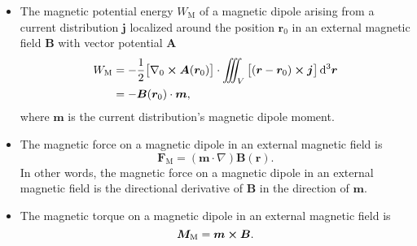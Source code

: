 \documentclass[11pt, a4paper]{article}
\newcommand{\diff}{\mathop{}\!\mathrm{d}} %
\newcommand{\dr}{\diff^{3} \r}  %
\renewcommand{\vec}[1]{\bm{#1}} %
\renewcommand{\r}{\vec{r}}
\newcommand{\B}{\vec{B}} %
\newcommand{\A}{\vec{A}} %
\newcommand{\m}{\vec{m}}  %
\renewcommand{\j}{\vec{j}}  %
\renewcommand{\grad}{\nabla}
\begin{document}
\begin{itemize}
    \item The magnetic potential energy $ W_{\text{M}} $ of a magnetic dipole arising from a current distribution $ \j $ localized around the position $ \r_{0} $ in an external magnetic field $ \B $ with vector potential $ \A $
	\begin{align*}
		W_{\text{M}} &=  -\frac{1}{2} \big[\grad_{0}\cross \A(\r_{0})\big] \cdot \iiint_{V}\big[(\r - \r_{0}) \cross \j\big] \dr\\
		&= - \B(\r_{0})  \cdot \m,
	\end{align*}
    where $ \m $ is the current distribution's magnetic dipole moment.

    \item The magnetic force on a magnetic dipole in an external magnetic field is
	\begin{equation*}
		\vec{F}_{\text{M}} = (\m \cdot \grad)\B(\r).
	\end{equation*}
	In other words, the magnetic force on a magnetic dipole in an external magnetic field is the directional derivative of $ \B $ in the direction of $ \m $.

	\item The magnetic torque on a magnetic dipole in an external magnetic field is
	\begin{equation*}
		\vec{M}_{\text{M}} = \m \cross \B.
	\end{equation*}

\end{itemize}
\end{document}
